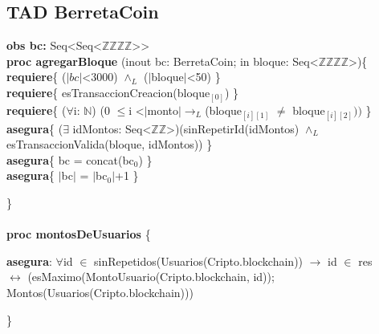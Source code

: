 \documentclass{article}
\begin{document}
\thispagestyle{empty}

\newpage %
\setcounter{page}{1}
\subsection*{TAD \textdollar BerretaCoin}
    \textbf{obs bc:} Seq\textless Seq\textless$\mathds{Z}$\texttimes$\mathds{Z}$\texttimes$\mathds{Z}$\texttimes$\mathds{Z}$\textgreater\textgreater\\

    \textbf{proc agregarBloque} (inout bc: \textdollar BerretaCoin;
                                in bloque: Seq\textless$\mathds{Z}$\texttimes$\mathds{Z}$\texttimes$\mathds{Z}$\texttimes$\mathds{Z}$\textgreater)\{
        \indent\indent \textbf{requiere}\{ ($|bc|$\textless3000) $\land_L$ ($|$bloque$|$\textless50) \}\\
        \indent\indent \textbf{requiere}\{ esTransaccionCreacion(bloque$_{[0]}$) \}\\
        \indent\indent \textbf{requiere}\{ ($\forall$i: $\mathds{N}$)
                                (0 $\leq$i \textless $|$monto$|\rightarrow_L$(bloque$_{[i][1]}$ $\neq$ bloque$_{[i][2]}))$ \}\\
        \indent\indent \textbf{asegura}\{ ($\exists$ idMontos: Seq\textless$\mathds{Z}$\texttimes$\mathds{Z}$\textgreater)(sinRepetirId(idMontos) $\land_L$\\
        \indent\indent\indent\indent\indent esTransaccionValida(bloque, idMontos)) \}\\
        \indent\indent \textbf{asegura}\{ bc = concat(bc$_0$) \}\\
        \indent\indent \textbf{asegura}\{ $|$bc$|$ = $|$bc$_0|$+1 \}

    \}\\\\

    \textbf{proc montosDeUsuarios} \{

        \indent\indent \textbf{asegura}: $\forall$id $\in$ sinRepetidos(Usuarios(Cripto.blockchain)) $\rightarrow$ id $\in$ res\\
        \indent\indent\indent\indent\indent $\longleftrightarrow$ (esMaximo(MontoUsuario(Cripto.blockchain, id));\\
        \indent\indent\indent\indent\indent Montos(Usuarios(Cripto.blockchain)))

    \}\\\\
\end{document}
